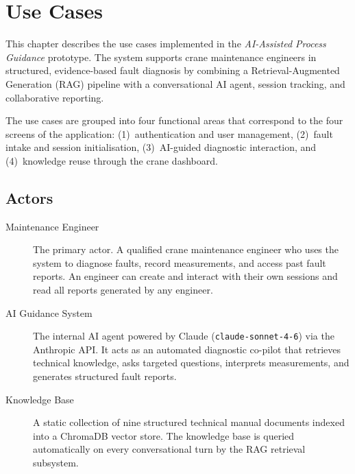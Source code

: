 
\section{Use Cases\label{sec:use_cases}}

This chapter describes the use cases implemented in the \textit{AI-Assisted Process Guidance}
prototype. The system supports crane maintenance engineers in structured, evidence-based fault
diagnosis by combining a Retrieval-Augmented Generation (RAG) pipeline with a conversational
AI agent, session tracking, and collaborative reporting.

The use cases are grouped into four functional areas that correspond to the four screens of
the application: (1)~authentication and user management, (2)~fault intake and session
initialisation, (3)~AI-guided diagnostic interaction, and (4)~knowledge reuse through the
crane dashboard.

\subsection{Actors\label{sec:actors}}

\begin{description}
    \item[Maintenance Engineer]
        The primary actor. A qualified crane maintenance engineer who uses the system to
        diagnose faults, record measurements, and access past fault reports. An engineer
        can create and interact with their own sessions and read all reports generated by
        any engineer.

    \item[AI Guidance System]
        The internal AI agent powered by Claude (\texttt{claude-sonnet-4-6}) via the
        Anthropic API. It acts as an automated diagnostic co-pilot that retrieves
        technical knowledge, asks targeted questions, interprets measurements, and
        generates structured fault reports.

    \item[Knowledge Base]
        A static collection of nine structured technical manual documents indexed into
        a ChromaDB vector store. The knowledge base is queried automatically on every
        conversational turn by the RAG retrieval subsystem.
\end{description}

